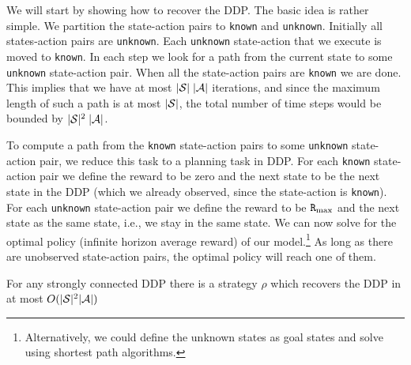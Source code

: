 We will start by showing how to recover the DDP. The basic idea is
rather simple. We partition the state-action pairs to \texttt{known}
and \texttt{unknown}. Initially all states-action pairs are \texttt{unknown}.
Each \texttt{unknown} state-action that we execute is moved to \texttt{known}. In each
step we look for a path from the current state to some \texttt{unknown}
state-action pair. When all the state-action pairs are \texttt{known} we are
done. This implies that we have at most $|\mathcal{S}|\;|\mathcal{A}|$
iterations, and since the maximum length of such a path is at most
$|\mathcal{S}|$, the total number of time steps would be bounded by
$|\mathcal{S}|^2\;|\mathcal{A}|$.

To compute a path from the \texttt{known} state-action pairs to some \texttt{unknown}
state-action pair, we reduce this task to a planning task in DDP.
%
For each \texttt{known} state-action pair  we define the reward to be zero and the
next state to be the next state in the DDP (which we already observed, since the state-action is \texttt{known}). 
For each \texttt{unknown}
state-action pair we define the reward to be ${\tt R}_{\max }$ and the next state
as the same state, i.e., we stay in the same state. We can now solve for the optimal
policy (infinite horizon average reward) of our model.\footnote{Alternatively, we could define the unknown states as goal states and solve using shortest path algorithms.} As long as
there are unobserved state-action pairs, the optimal policy will
reach one of them.

\begin{theorem}
For any strongly connected DDP there is a strategy $\rho$ which
recovers the DDP in at most $O(|\mathcal{S}|^2 |\mathcal{A}|)$
\end{theorem}

